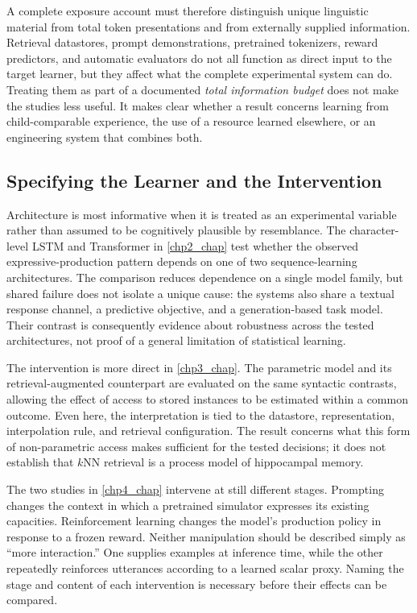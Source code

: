 A complete exposure account must therefore distinguish unique linguistic material from total token presentations and from externally supplied information. Retrieval datastores, prompt demonstrations, pretrained tokenizers, reward predictors, and automatic evaluators do not all function as direct input to the target learner, but they affect what the complete experimental system can do. Treating them as part of a documented \emph{total information budget} does not make the studies less useful. It makes clear whether a result concerns learning from child-comparable experience, the use of a resource learned elsewhere, or an engineering system that combines both.

\subsection{Specifying the Learner and the Intervention}
\label{sec:gd_calibration_learner}

Architecture is most informative when it is treated as an experimental variable rather than assumed to be cognitively plausible by resemblance. The character-level LSTM and Transformer in \cref{chp2_chap} test whether the observed expressive-production pattern depends on one of two sequence-learning architectures. The comparison reduces dependence on a single model family, but shared failure does not isolate a unique cause: the systems also share a textual response channel, a predictive objective, and a generation-based task model. Their contrast is consequently evidence about robustness across the tested architectures, not proof of a general limitation of statistical learning.

The intervention is more direct in \cref{chp3_chap}. The parametric model and its retrieval-augmented counterpart are evaluated on the same syntactic contrasts, allowing the effect of access to stored instances to be estimated within a common outcome. Even here, the interpretation is tied to the datastore, representation, interpolation rule, and retrieval configuration. The result concerns what this form of non-parametric access makes sufficient for the tested decisions; it does not establish that $k$NN retrieval is a process model of hippocampal memory.

The two studies in \cref{chp4_chap} intervene at still different stages. Prompting changes the context in which a pretrained simulator expresses its existing capacities. Reinforcement learning changes the model's production policy in response to a frozen reward. Neither manipulation should be described simply as ``more interaction.'' One supplies examples at inference time, while the other repeatedly reinforces utterances according to a learned scalar proxy. Naming the stage and content of each intervention is necessary before their effects can be compared.

